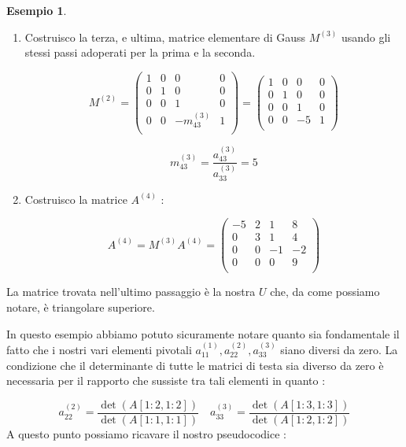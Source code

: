\documentclass[12pt, a4paper]{book}
\theoremstyle{definition}
\newtheorem{exmp}{Esempio}[section]
\begin{document}
\begin{flushleft}
\begin{exmp}
\begin{enumerate}
 	\item Costruisco la terza,  e ultima,  matrice elementare di Gauss $M^{(3)}$ usando gli stessi passi adoperati per la prima e la seconda.
 	
 	\[ 
 			M^{(2)} = 
				\begin{pmatrix}
					1 & 0 & 0 & 0 \\
					0 & 1 & 0 &0 \\
					0& 0 & 1 & 0\\
					0 &0 & -m^{(3)}_{43}  & 1 \\
				\end{pmatrix}
				=
				\begin{pmatrix}
					1 & 0 & 0 & 0 \\
					0 & 1 & 0 &0 \\
					0& 0 & 1 & 0\\
					0 & 0 & -5 & 1 \\
				\end{pmatrix}
 	\]
 	
 	 \[ m^{(3)}_{43} = \frac{a^{(3)}_{43}}{a^{(3)}_{33}} = 5  \]
 	 
 	\item Costruisco la matrice $A^{(4)}$ :
 	 
 	 	\[
 			A^{(4)} =  M^{(3)}A^{(4)} = 
 				\begin{pmatrix}
					-5 & 2 & 1 & 8 \\
					0 & 3 & 1 & 4 \\
					0 & 0 & -1 & -2 \\
					0 & 0 & 0 & 9 \\
				\end{pmatrix}
 		\]

\end{enumerate}
La matrice trovata nell'ultimo passaggio è la nostra $U$ che, da come possiamo notare, è triangolare superiore.
\end{exmp}

In questo esempio abbiamo potuto sicuramente notare quanto sia fondamentale il fatto che i nostri vari elementi pivotali $a^{(1)}_{11}, a^{(2)}_{22}, a^{(3)}_{33}$ siano diversi da zero.  La condizione che il determinante di tutte le matrici di testa sia diverso da zero è necessaria per il rapporto che sussiste tra tali elementi in quanto :

\[	
	a^{(2)}_{22} = \frac{\det(A[1:2, 1:2])}{\det(A[1:1, 1:1])} \quad a^{(3)}_{33} = \frac{\det(A[1:3, 1:3])}{\det(A[1:2, 1:2])}
\]
\newpage
A questo punto possiamo ricavare il nostro pseudocodice :


\end{flushleft}
\end{document}
